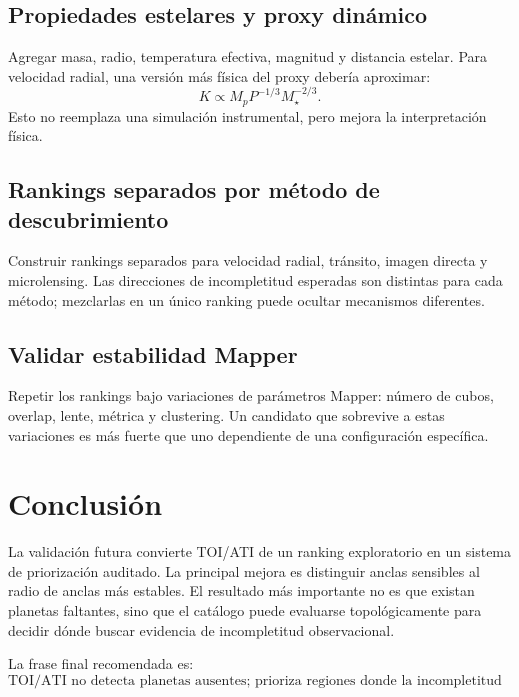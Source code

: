 \documentclass[11pt]{article}
\begin{document}
\subsection{Propiedades estelares y proxy dinámico}

Agregar masa, radio, temperatura efectiva, magnitud y distancia estelar. Para velocidad radial, una versión más física del proxy debería aproximar:
\[
K\propto M_pP^{-1/3}M_{\star}^{-2/3}.
\]
Esto no reemplaza una simulación instrumental, pero mejora la interpretación física.

\subsection{Rankings separados por método de descubrimiento}

Construir rankings separados para velocidad radial, tránsito, imagen directa y microlensing. Las direcciones de incompletitud esperadas son distintas para cada método; mezclarlas en un único ranking puede ocultar mecanismos diferentes.

\subsection{Validar estabilidad Mapper}

Repetir los rankings bajo variaciones de parámetros Mapper: número de cubos, overlap, lente, métrica y clustering. Un candidato que sobrevive a estas variaciones es más fuerte que uno dependiente de una configuración específica.

\section{Conclusión}

La validación futura convierte TOI/ATI de un ranking exploratorio en un sistema de priorización auditado. La principal mejora es distinguir anclas sensibles al radio de anclas más estables. El resultado más importante no es que existan planetas faltantes, sino que el catálogo puede evaluarse topológicamente para decidir dónde buscar evidencia de incompletitud observacional.

La frase final recomendada es:
\[
\boxed{\text{TOI/ATI no detecta planetas ausentes; prioriza regiones donde la incompletitud observacional es topológicamente plausible y auditable.}}
\]
\end{document}
